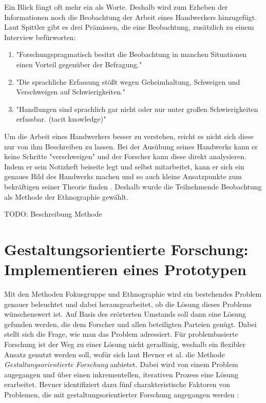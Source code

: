 Ein Blick fängt oft mehr ein als Worte. Deshalb wird zum Erheben der Informationen noch die Beobachtung der Arbeit eines Handwerkers hinzugefügt. Laut Spittler \cite{spittler_teilnehmende_2001} gibt es drei Prämissen, die eine Beobachtung, zusätzlich zu einem Interview befürworten:

\begin{enumerate}
	\item "Forschungspragmatisch besitzt die Beobachtung in manchen Situationen einen Vorteil gegenüber der Befragung."
	\item "Die sprachliche Erfassung stößt wegen Geheimhaltung, Schweigen und Verschweigen auf Schwierigkeiten."
	\item "Handlungen sind sprachlich gar nicht oder nur unter großen Schwierigkeiten erfassbar. (tacit knowledge)"
\end{enumerate}

Um die Arbeit eines Handwerkers besser zu verstehen, reicht es nicht sich diese nur von ihm Beschreiben zu lassen. Bei der Ausübung seines Handwerks kann er keine Schritte "verschweigen" und der Forscher kann diese direkt analysieren. Indem er sein Notizheft beiseite legt und selbst mitarbeitet, kann er sich ein genaues Bild des Handwerks machen und so auch kleine Ansatzpunkte zum bekräftigen seiner Theorie finden \cite{malinowski_argonauts_1922}. Deshalb wurde die Teilnehmende Beobachtung als Methode der Ethnographie gewählt.

TODO: Beschreibung Methode

\section{Gestaltungsorientierte Forschung: Implementieren eines Prototypen}

Mit den Methoden Fokusgruppe und Ethnographie wird ein bestehendes Problem genauer beleuchtet und dabei herausgearbeitet, ob die Lösung dieses Problems wünschenswert ist. Auf Basis des erörterten Umstands soll dann eine Lösung gefunden werden, die dem Forscher und allen beteiligten Parteien genügt. Dabei stellt sich die Frage, wie man das Problem adressiert. Für problembasierte Forschung ist der Weg zu einer Lösung nicht geradlinig, weshalb ein flexibler Ansatz genutzt werden soll, wofür sich laut Hevner et al. \cite{hevner_design_nodate} die Methode \textit{Gestaltungsorientierte Forschung} anbietet. Dabei wird von einem Problem augegangen und über einen inkrementellen, iterativen Prozess eine Lösung erarbeitet. Hevner identifiziert dazu fünf charakteristische Faktoren von Problemen, die mit gestaltungsorientierter Forschung angegangen werden \cite{hevner_design_nodate}:

